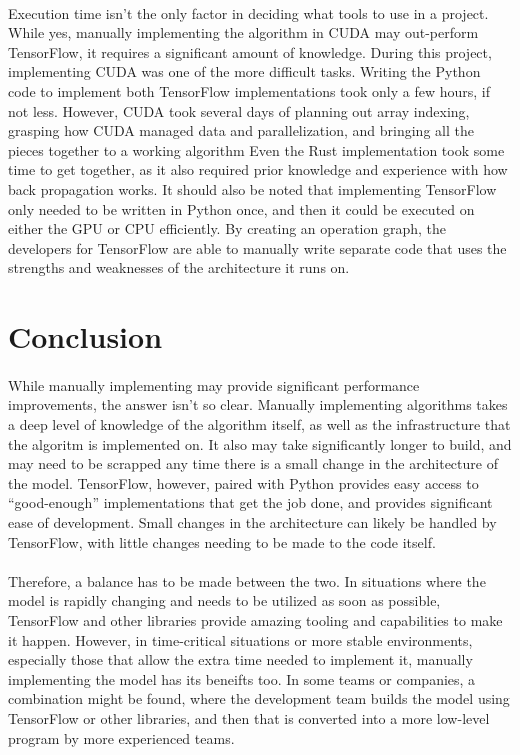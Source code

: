 \documentclass[12pt]{article}
\begin{document}
\paragraph{} %
Execution time isn't the only factor in deciding what tools to use in a project.
While yes, manually implementing the algorithm in CUDA may out-perform TensorFlow, it requires a significant amount of knowledge.
During this project, implementing CUDA was one of the more difficult tasks.
Writing the Python code to implement both TensorFlow implementations took only a few hours, if not less.
However, CUDA took several days of planning out array indexing, grasping how CUDA managed data and parallelization, and bringing all the pieces together to a working algorithm
Even the Rust implementation took some time to get together, as it also required prior knowledge and experience with how back propagation works.
It should also be noted that implementing TensorFlow only needed to be written in Python once, and then it could be executed on either the GPU or CPU efficiently.
By creating an operation graph, the developers for TensorFlow are able to manually write separate code that uses the strengths and weaknesses of the architecture it runs on.

\section{Conclusion}

\paragraph{}
While manually implementing may provide significant performance improvements, the answer isn't so clear.
Manually implementing algorithms takes a deep level of knowledge of the algorithm itself, as well as the infrastructure that the algoritm is implemented on.
It also may take significantly longer to build, and may need to be scrapped any time there is a small change in the architecture of the model.
TensorFlow, however, paired with Python provides easy access to ``good-enough'' implementations that get the job done, and provides significant ease of development.
Small changes in the architecture can likely be handled by TensorFlow, with little changes needing to be made to the code itself.

\paragraph{}
Therefore, a balance has to be made between the two.
In situations where the model is rapidly changing and needs to be utilized as soon as possible, TensorFlow and other libraries provide amazing tooling and capabilities to make it happen.
However, in time-critical situations or more stable environments, especially those that allow the extra time needed to implement it, manually implementing the model has its beneifts too.
In some teams or companies, a combination might be found, where the development team builds the model using TensorFlow or other libraries, and then that is converted into a more low-level program by more experienced teams.
\end{document}
